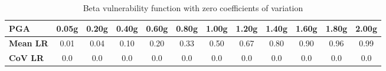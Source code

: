 \begin{table}[htbp]

\centering
\begin{tabular}{ l c c c c c c c c c c c}

\hline
\rowcolor{anti-flashwhite}
\bf{PGA} & \bf{0.05g} & \bf{0.20g} & \bf{0.40g} & \bf{0.60g} & \bf{0.80g} & \bf{1.00g} & \bf{1.20g} & \bf{1.40g} & \bf{1.60g} & \bf{1.80g} & \bf{2.00g} \\
\hline
\bf{Mean LR} & 0.01 & 0.04 & 0.10 & 0.20 & 0.33 & 0.50 & 0.67 & 0.80 & 0.90 & 0.96 & 0.99 \\
\bf{CoV LR} & 0.0 & 0.0 & 0.0 & 0.0 & 0.0 & 0.0 & 0.0 & 0.0 & 0.0 & 0.0 & 0.0 \\
\hline
\end{tabular}

\caption{Beta vulnerability function with zero coefficients of variation}
\label{tab:vf-bt-tax1-zcov}
\end{table}